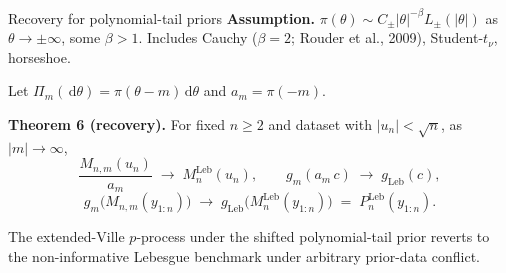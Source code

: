 \documentclass[final]{beamer}
\newcommand{\dd}{\,\mathrm{d}}
\newcommand{\Leb}{\mathrm{Leb}}
\newcommand{\Lap}{\mathrm{Lap}}
\newlength{\colwidth}
\begin{document}
\begin{frame}[t]
\begin{columns}[t]
\begin{column}{\colwidth}




  \begin{alertblock}{Recovery for polynomial-tail priors}
    \textbf{Assumption.} $\pi(\theta)\sim C_\pm |\theta|^{-\beta}L_\pm(|\theta|)$ as $\theta\to\pm\infty$, some $\beta>1$. Includes Cauchy ($\beta=2$; Rouder et al., 2009), Student-$t_\nu$, horseshoe.

    Let $\Pi_m(\dd\theta)=\pi(\theta-m)\dd\theta$ and $a_m=\pi(-m)$.

    \vspace{0.15cm}
    \textbf{Theorem 6 (recovery).} For fixed $n\ge 2$ and dataset with $|u_n|<\sqrt n$, as $|m|\to\infty$,
    \[
      \frac{M_{n,m}(u_n)}{a_m}\;\to\;M_n^{\Leb}(u_n),\qquad
      g_m(a_m\,c)\;\to\;g_{\Leb}(c),
    \]
    \[
      g_m\!\bigl(M_{n,m}(y_{1:n})\bigr)\;\longrightarrow\;g_{\Leb}\!\bigl(M_n^{\Leb}(y_{1:n})\bigr)\;=\;P_n^{\Leb}(y_{1:n}).
    \]

    \vspace{0.1cm}
    The extended-Ville $p$-process under the shifted polynomial-tail prior \alert{reverts to the non-informative Lebesgue benchmark} under arbitrary prior-data conflict. %


\end{alertblock}
\end{column}
\end{columns}
\end{frame}
\end{document}
